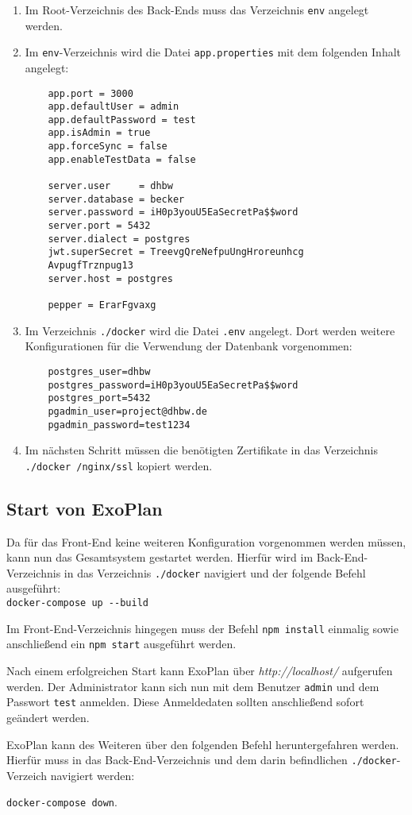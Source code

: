 \begin{enumerate}
	\item Im Root-Verzeichnis des Back-Ends muss das Verzeichnis \texttt{env} angelegt werden.
	\item Im \texttt{env}-Verzeichnis wird die Datei \texttt{app.properties} mit dem folgenden Inhalt angelegt:
	\begin{lstlisting}
	app.port = 3000
	app.defaultUser = admin
	app.defaultPassword = test
	app.isAdmin = true
	app.forceSync = false
	app.enableTestData = false
	
	server.user     = dhbw
	server.database = becker
	server.password = iH0p3youU5EaSecretPa$$word
	server.port = 5432
	server.dialect = postgres
	jwt.superSecret = TreevgQreNefpuUngHroreunhcg
	AvpugfTrznpug13
	server.host = postgres
	
	pepper = ErarFgvaxg
	\end{lstlisting}
	
	\item Im Verzeichnis \texttt{./docker} wird die Datei \texttt{.env} angelegt. Dort werden weitere Konfigurationen für die Verwendung der Datenbank vorgenommen:
	
	\begin{lstlisting}
	postgres_user=dhbw
	postgres_password=iH0p3youU5EaSecretPa$$word
	postgres_port=5432
	pgadmin_user=project@dhbw.de
	pgadmin_password=test1234
	\end{lstlisting}
	
	\item Im nächsten Schritt müssen die benötigten Zertifikate in das Verzeichnis \texttt{./docker
		/nginx/ssl} kopiert werden.
	
\end{enumerate}

\subsection{Start von ExoPlan}

Da für das Front-End keine weiteren Konfiguration vorgenommen werden müssen, kann nun das Gesamtsystem gestartet werden. 
Hierfür wird im Back-End-Verzeichnis in das Verzeichnis \texttt{./docker} navigiert und der folgende Befehl ausgeführt:\\ 
\texttt{docker-compose up -{}-build}

Im Front-End-Verzeichnis hingegen muss der Befehl \texttt{npm install} einmalig sowie anschließend ein \texttt{npm start} ausgeführt werden.

Nach einem erfolgreichen Start kann ExoPlan über \textit{http://localhost/} aufgerufen werden. 
Der Administrator kann sich nun mit dem Benutzer \texttt{admin} und dem Passwort \texttt{test} anmelden. Diese Anmeldedaten sollten anschließend sofort geändert werden.

ExoPlan kann des Weiteren über den folgenden Befehl heruntergefahren werden. 
Hierfür muss in das Back-End-Verzeichnis und dem darin befindlichen \texttt{./docker}-Verzeich navigiert werden:

\texttt{docker-compose down}.